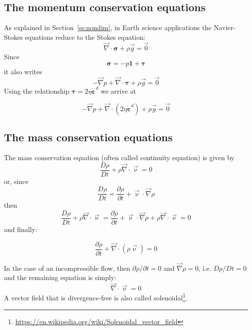 \subsection{The momentum conservation equations} 

As explained in Section~\ref{ss:nondim}, in Earth science applications the Navier-Stokes 
equations reduce to the Stokes equation:
\begin{equation}
{\vec \nabla}\cdot {\bm \sigma} + \rho {\vec g} = \vec{0}
\end{equation}
Since 
\begin{equation}
{\bm \sigma} = -p {\bm 1} + {\bm \tau}
\end{equation}
it also writes
\begin{equation}
-{\vec \nabla}p + {\vec \nabla}\cdot {\bm \tau} + \rho {\vec g} = \vec{0}
\end{equation}
Using the relationship ${\bm \tau} = 2 \eta \dot{\bm \varepsilon}^d$ we arrive at 
\begin{mdframed}[backgroundcolor=blue!5]
\begin{equation}
-{\vec \nabla}p + {\vec \nabla}\cdot (2 \eta \dot{\bm \varepsilon}^d ) + \rho {\vec g} = \vec{0}
\end{equation}
\end{mdframed}

\subsection{The mass conservation equations} 

The mass conservation equation (often called continuity equation) is given by
\[
\frac{D\rho}{Dt} + \rho {\vec \nabla}\cdot{\vec \upnu} = 0
\]
or, since 
\[
\frac{D\rho}{Dt} = \frac{\partial \rho}{\partial t} + {\vec \upnu}\cdot {\vec \nabla}\rho
\]
then 
\[
\frac{D\rho}{Dt} + \rho {\vec \nabla}\cdot{\vec \upnu} = 
\frac{\partial \rho}{\partial t} + {\vec \upnu}\cdot {\vec \nabla}\rho
 + \rho {\vec \nabla}\cdot{\vec \upnu} = 0 
\]
and finally:
\begin{mdframed}[backgroundcolor=blue!5]
\[
\frac{\partial \rho}{\partial t} + {\vec \nabla}\cdot(\rho {\vec \upnu}) = 0
\]
\end{mdframed}
In the case of an incompressible flow, then $\partial \rho/\partial t=0$ and 
${\vec \nabla}\rho=0$, i.e. $D\rho/Dt=0$ and the remaining equation is simply:
\[
{\vec \nabla}\cdot{\vec \upnu} = 0
\]
A vector field that is divergence-free is also called 
solenoidal\footnote{\url{https://en.wikipedia.org/wiki/Solenoidal_vector_field}}.


